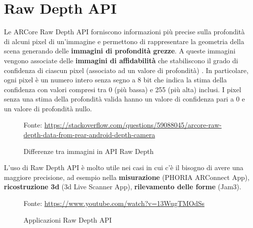 \documentclass[crop=false, class=book]{standalone}
\begin{document}
		\section{Raw Depth API}
		Le ARCore Raw Depth API forniscono informazioni più precise sulla profondità di alcuni pixel di un'immagine e permettono di rappresentare la geometria della scena generando delle \textbf{immagini di profondità grezze}. A 					queste immagini vengono associate delle \textbf{immagini di affidabilità} che stabiliscono il grado di confidenza di ciascun pixel (associato ad un valore di profondità) \cite{mobilear2021rawdepth}. In particolare, ogni pixel è un 				numero intero senza segno a 8 bit che indica la stima della confidenza con valori compresi tra 0 (più bassa) e 255 (più alta) inclusi. I pixel senza una stima della profondità valida hanno un valore di confidenza pari a 0 e un valore di profondità nullo.
		
		\begin{figure}
				\centering
				{Fonte: \url{https://stackoverflow.com/questions/59088045/arcore-raw-depth-data-from-rear-android-depth-camera}}
				\caption{Differenze tra immagini in API Raw Depth }
				\label{fig: depth-raw-api}
		\end{figure}
		
		\begin{flushleft}
			L'uso di Raw Depth API è molto utile nei casi in cui c'è il bisogno di avere una maggiore precisione, ad esempio nella \textbf{misurazione} (PHORIA ARConnect App), \textbf{ricostruzione 3d}  (3d Live Scanner App), \textbf{rilevamento delle forme} (Jam3).
			
		\end{flushleft}
		
		\begin{figure}
				\centering
				{Fonte: \url{https://www.youtube.com/watch?v=13WugTMOdSs}}
				\caption{Applicazioni Raw Depth API }
				\label{fig: app-depth-raw-api}
		\end{figure}
\end{document}
